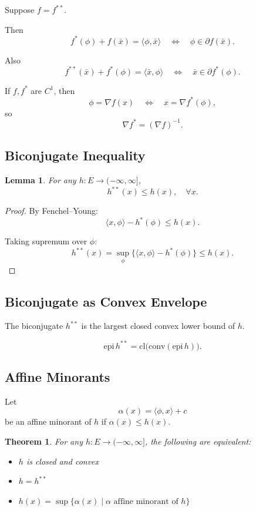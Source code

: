 \documentclass[12pt,oneside]{book}
\numberwithin{equation}{section}
\theoremstyle{definition}
\theoremstyle{plain}
\newtheorem{theorem}{Theorem}[section]
\newtheorem{lemma}{Lemma}[section]
\theoremstyle{remark}
\begin{document}
Suppose $f = f^{**}$.

Then
\[
f^*(\phi) + f(\bar{x}) = \langle \phi,\bar{x} \rangle
\quad \Longleftrightarrow \quad
\phi \in \partial f(\bar{x}).
\]

Also
\[
f^{**}(\bar{x}) + f^*(\phi) = \langle \bar{x},\phi \rangle
\quad \Longleftrightarrow \quad
\bar{x} \in \partial f^*(\phi).
\]

If $f,f^*$ are $C^1$, then
\[
\phi = \nabla f(x)
\quad \Longleftrightarrow \quad
x = \nabla f^*(\phi),
\]
so
\[
\nabla f^* = (\nabla f)^{-1}.
\]

\subsection{Biconjugate Inequality}

\begin{lemma}
For any $h:E\to (-\infty,\infty]$,
\[
h^{**}(x) \le h(x), \quad \forall x.
\]
\end{lemma}

\begin{proof}
By Fenchel--Young:
\[
\langle x,\phi\rangle - h^*(\phi) \le h(x).
\]

Taking supremum over $\phi$:
\[
h^{**}(x) = \sup_\phi \{\langle x,\phi\rangle - h^*(\phi)\}
\le h(x).
\]
\end{proof}

\subsection{Biconjugate as Convex Envelope}

The biconjugate $h^{**}$ is the largest closed convex lower bound of $h$.

\[
\mathrm{epi}\,h^{**} = \mathrm{cl}\big(\mathrm{conv}(\mathrm{epi}\,h)\big).
\]

\subsection{Affine Minorants}

Let
\[
\alpha(x) = \langle \phi,x\rangle + c
\]
be an affine minorant of $h$ if $\alpha(x)\le h(x)$.

\begin{theorem}
For any $h:E\to(-\infty,\infty]$, the following are equivalent:
\begin{itemize}
\item[(i)] $h$ is closed and convex
\item[(ii)] $h = h^{**}$
\item[(iii)] $h(x) = \sup\{\alpha(x) \mid \alpha \text{ affine minorant of } h\}$
\end{itemize}
\end{theorem}
\end{document}
